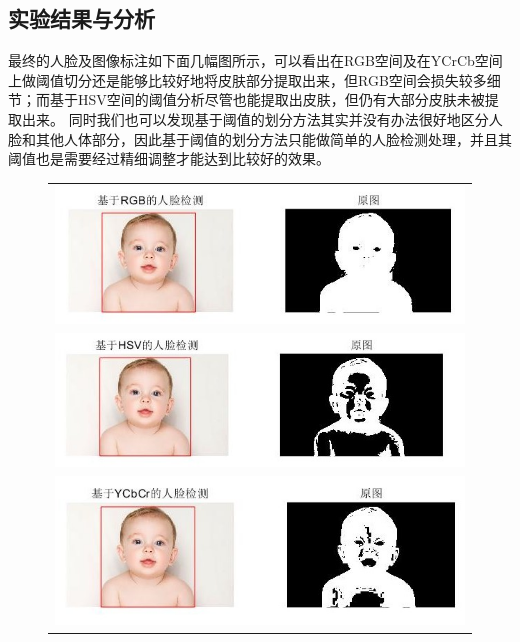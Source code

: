 \documentclass[logo,reportComp]{thesis}
\begin{document}
\subsection{实验结果与分析}
最终的人脸及图像标注如下面几幅图所示，可以看出在RGB空间及在YCrCb空间上做阈值切分还是能够比较好地将皮肤部分提取出来，但RGB空间会损失较多细节；而基于HSV空间的阈值分析尽管也能提取出皮肤，但仍有大部分皮肤未被提取出来。
同时我们也可以发现基于阈值的划分方法其实并没有办法很好地区分人脸和其他人体部分，因此基于阈值的划分方法只能做简单的人脸检测处理，并且其阈值也是需要经过精细调整才能达到比较好的效果。
\begin{figure}[H]
\centering
\begin{tabular}{c}
\includegraphics[width=0.8\linewidth]{fig/test01.jpg}\\
\includegraphics[width=0.8\linewidth]{fig/test02.jpg}\\
\includegraphics[width=0.8\linewidth]{fig/test03.jpg}
\end{tabular}
\end{figure}
\end{document}
